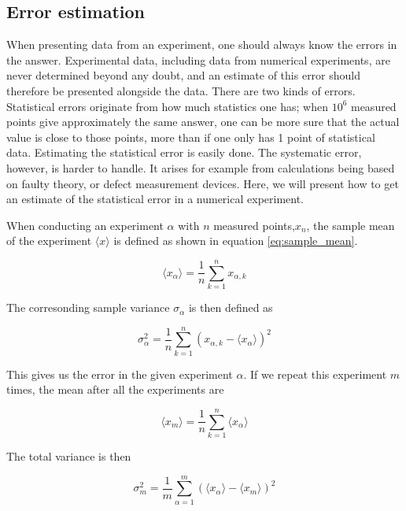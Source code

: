 \documentclass[norsk,a4paper,12pt]{article}
\begin{document}
\subsection{Error estimation}
When presenting data from an experiment, one should always know the errors in the answer. Experimental data, including data from numerical experiments, are never determined beyond any doubt, and an estimate of this error should therefore be presented alongside the data. 
There are two kinds of errors. Statistical errors originate from how much statistics one has; when $10^6$ measured points give approximately the same answer, one can be more sure that the actual value is close to those points, more than if one only has 1 point of statistical data. Estimating the statistical error is easily done. The systematic error, however, is harder to handle. It arises for example from calculations being based on faulty theory, or defect measurement devices. Here, we will present how to get an estimate of the statistical error in a numerical experiment.
\par 
\vspace{3mm}
When conducting an experiment $\alpha$ with $n$ measured points,$x_n$, the sample mean of the experiment $\langle x \rangle$ is defined as shown in equation \ref{eq:sample_mean}.

\begin{equation}
\label{eq:sample_mean}
\langle x_{\alpha} \rangle = \frac{1}{n} \sum_{k=1}^n x_{\alpha,k}
\end{equation}

The corresonding sample variance $\sigma_{\alpha}$ is then defined as

\begin{equation}
\sigma_{\alpha}^2 = \frac{1}{n} \sum_{k=1}^n (x_{\alpha,k} - \langle x_{\alpha} \rangle )^2
\end{equation}

This gives us the error in the given experiment $\alpha$. If we repeat this experiment $m$ times, the mean after all the experiments are

\begin{equation}
\label{eq:mean}
\langle x_{m} \rangle = \frac{1}{n} \sum_{k=1}^n  \langle x_{\alpha} \rangle
\end{equation}

The total variance is then

\begin{equation}
\sigma_m^2 = \frac{1}{m} \sum_{\alpha=1}^m ( \langle x_{\alpha} \rangle - \langle x_{m} \rangle )^2
\end{equation}
\end{document}
